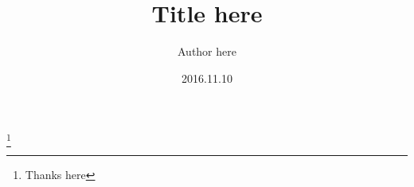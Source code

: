 \documentclass[aip,cha,10pt,a4paper,reprint,superscriptaddress]{revtex4-1}
\begin{document}
  \title{Title here}
  \author{Author here}
  \thanks{Thanks here}
  \date{2016.11.10}

  

  \maketitle

  
  
  
  
\end{document}

